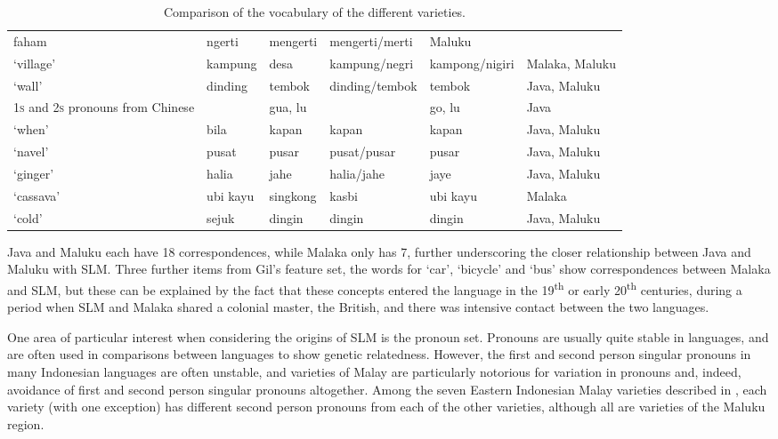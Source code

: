 \begin{sidewaystable}
\begin{tabular}{llllll}
faham &
ngerti &
mengerti &
mengerti/merti &
Maluku\\
`village' &
kampung &
desa &
kampung/negri &
kampong/nigiri &
Malaka, Maluku\\
`wall' &
dinding &
tembok &
dinding/tembok &
tembok &
Java, Maluku\\
1\textsc{s} and 2\textsc{s} pronouns from Chinese &
 &
gua, lu &
 &
go, lu &
Java\\
`when' &
bila &
kapan &
kapan &
kapan &
Java, Maluku\\
`navel' &
pusat &
pusar &
pusat/pusar &
pusar &
Java, Maluku\\
`ginger' &
halia &
jahe &
halia/jahe &
jaye &
Java, Maluku\\
`cassava' &
ubi kayu &
singkong &
kasbi &
ubi kayu &
Malaka\\
`cold' &
sejuk &
dingin &
dingin &
dingin &
Java, Maluku\\
\end{tabular}
\caption{Comparison of the vocabulary of the different varieties.}
\label{paauw:tab:cognates}
\end{sidewaystable}

Java and Maluku each have 18 correspondences, while Malaka only has 7, further underscoring the closer relationship between Java and Maluku with SLM. Three further items from Gil's feature set, the words for `car', `bicycle' and `bus' show correspondences between Malaka and SLM, but these can be explained by the fact that these concepts entered the language in the 19\textsuperscript{th} or early 20\textsuperscript{th} centuries, during a period when SLM and Malaka shared a colonial master, the British, and there was intensive contact between the two languages.

One area of particular interest when considering the origins of SLM is the pronoun set. Pronouns are usually quite stable in languages, and are often used in comparisons between languages to show genetic relatedness. However, the first and second person singular pronouns in many Indonesian languages are often unstable, and varieties of Malay are particularly notorious for variation in pronouns and, indeed, avoidance of first and second person singular pronouns altogether. Among the seven Eastern Indonesian Malay varieties described in \citet{Paauw2008}, each variety (with one exception) has different second person pronouns from each of the other varieties, although all are varieties of the Maluku region.

